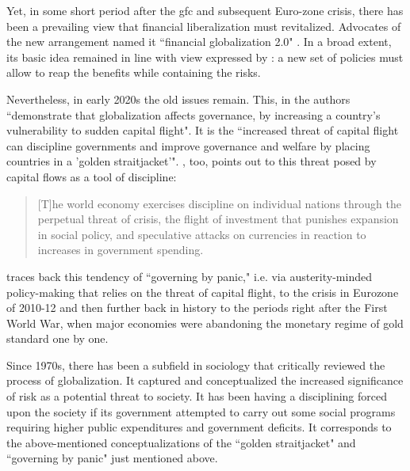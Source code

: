 Yet, in some short period after the \ac{gfc} and subsequent Euro-zone crisis, there has been a prevailing view that financial liberalization must revitalized.
Advocates of the new arrangement named it ``financial globalization 2.0" \citep{bis2016}.
In a broad extent, its basic idea remained in line with view expressed by \cite{eichengreen2000,eichengreen2001}: a new set of policies must allow to reap the benefits while containing the risks.

Nevertheless, in early 2020s the old issues remain. This, in \citep{blouin2022} the authors ``demonstrate that globalization affects governance, by increasing a country's vulnerability to sudden capital flight". It is the ``increased threat of capital flight can discipline governments and improve governance and welfare by placing countries in a 'golden straitjacket'". \cite{slobodian2018}, too, points out to this threat posed by capital flows as a tool of discipline:

\begin{quote}
[T]he world economy exercises discipline on individual nations through the perpetual threat of crisis, the flight of investment that punishes expansion in social policy, and speculative attacks on currencies in reaction to increases in government spending.
\citep[pp.~270-271]{slobodian2018}
\end{quote}

\cite{woodruff2016,woodruff2019} traces back this tendency of ``governing by panic," i.e. via austerity-minded policy-making that relies on the threat of capital flight, to the crisis in Eurozone of 2010-12 and then further back in history to the periods right after the First World War, when major economies were abandoning the monetary regime of gold standard one by one.

Since 1970s, there has been a subfield in sociology that critically reviewed the process of globalization. It captured and conceptualized the increased significance of risk as a potential threat to society. It has been having a disciplining forced upon the society if its government attempted to carry out some social programs requiring higher public expenditures and government deficits. It corresponds to the above-mentioned conceptualizations of the ``golden straitjacket" and ``governing by panic" just mentioned above.

